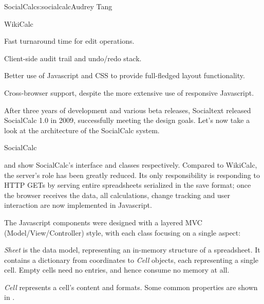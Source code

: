 \begin{aosachapter}{SocialCalc}{s:socialcalc}{Audrey Tang}
\begin{aosasect1}{WikiCalc}
\begin{aosaitemize}
  \item Fast turnaround time for edit operations.

  \item Client-side audit trail and undo/redo stack.

  \item Better use of Javascript and CSS to provide full-fledged layout
  functionality.

  \item Cross-browser support, despite the more extensive use of
  responsive Javascript.

\end{aosaitemize}

After three years of development and various beta releases, Socialtext
released SocialCalc 1.0 in 2009, successfully meeting the design
goals.  Let's now take a look at the architecture of the SocialCalc
system.

\end{aosasect1}

\begin{aosasect1}{SocialCalc}


 and  show
SocialCalc's interface and classes respectively.  Compared to
WikiCalc, the server's role has been greatly reduced.  Its only
responsibility is responding to HTTP GETs by serving entire
spreadsheets serialized in the save format; once the browser receives
the data, all calculations, change tracking and user interaction are
now implemented in Javascript.


The Javascript components were designed with a layered MVC
(Model/View/Controller) style, with each class focusing on a single
aspect:

\begin{aosadescription}

  \item{\emph{Sheet}} is the data model, representing an in-memory
  structure of a spreadsheet.
  It contains a dictionary from
  coordinates to \emph{Cell} objects, each representing a single cell.
  Empty cells need no entries, and hence consume no memory at all.

  \item{\emph{Cell}} represents a cell's content and formats.  Some
  common properties are shown in .


\end{aosadescription}
\end{aosasect1}
\end{aosachapter}
